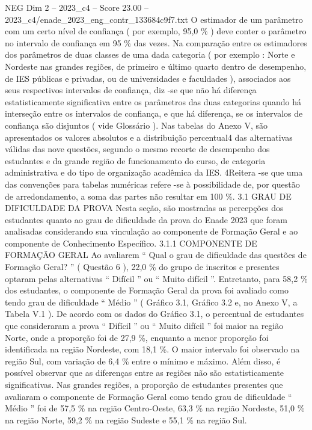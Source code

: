 \begin{textsample}{NEG Dim 2 – 2023\_c4 – Score 23.00 – 2023\_c4/enade\_2023\_eng\_contr\_133684c9f7.txt}
O estimador de um parâmetro com um certo nível de confiança ( por exemplo, 95,0 \% ) deve conter o parâmetro no intervalo de confiança em 95 \% das vezes.
Na comparação entre os estimadores dos parâmetros de duas classes de uma dada categoria ( por exemplo : Norte e Nordeste nas grandes regiões, de primeiro e último quarto dentro de desempenho, de IES públicas e privadas, ou de universidades e faculdades ), associados aos seus respectivos intervalos de confiança, diz -se que não há diferença estatisticamente significativa entre os parâmetros das duas categorias quando há interseção entre os intervalos de confiança, e que há diferença, se os intervalos de confiança são disjuntos ( vide Glossário ).
Nas tabelas do Anexo V, são apresentados os valores absolutos e a distribuição percentual4 das alternativas válidas das nove questões, segundo o mesmo recorte de desempenho dos estudantes e da grande região de funcionamento do curso, de categoria administrativa e do tipo de organização acadêmica da IES. 4Reitera -se que uma das convenções para tabelas numéricas refere -se à possibilidade de, por questão de arredondamento, a soma das partes não resultar em 100 \%. 3.1 GRAU DE DIFICULDADE DA PROVA Nesta seção, são mostradas as percepções dos estudantes quanto ao grau de dificuldade da prova do Enade 2023 que foram analisadas considerando sua vinculação ao componente de Formação Geral e ao componente de Conhecimento Específico. 3.1.1 COMPONENTE DE FORMAÇÃO GERAL Ao avaliarem “ Qual o grau de dificuldade das questões de Formação Geral? ” ( Questão 6 ), 22,0 \% do grupo de inscritos e presentes optaram pelas alternativas “ Difícil ” ou “ Muito difícil ”.
Entretanto, para 58,2 \% dos estudantes, o componente de Formação Geral da prova foi avaliado como tendo grau de dificuldade “ Médio ” ( Gráfico 3.1, Gráfico 3.2 e, no Anexo V, a Tabela V.1 ).
De acordo com os dados do Gráfico 3.1, o percentual de estudantes que consideraram a prova “ Difícil ” ou “ Muito difícil ” foi maior na região Norte, onde a proporção foi de 27,9 \%, enquanto a menor proporção foi identificada na região Nordeste, com 18,1 \%.
O maior intervalo foi observado na região Sul, com variação de 6,4 \% entre o mínimo e máximo.
Além disso, é possível observar que as diferenças entre as regiões não são estatisticamente significativas.
Nas grandes regiões, a proporção de estudantes presentes que avaliaram o componente de Formação Geral como tendo grau de dificuldade “ Médio ” foi de 57,5 \% na região Centro-Oeste, 63,3 \% na região Nordeste, 51,0 \% na região Norte, 59,2 \% na região Sudeste e 55,1 \% na região Sul.

\end{textsample}
